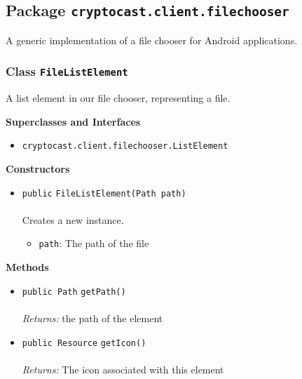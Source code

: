 \subsection{Package \lstinline!cryptocast.client.filechooser!}
A generic implementation of a file chooser for Android applications.

\subsubsection{Class \lstinline|FileListElement|}
A list element in our file chooser, representing a file. \\
\noindent\begin{minipage}[t]{5cm}
\vspace{0.3em}
\hspace*{2em}
\vspace{0.3em}
\end{minipage}



\textbf{\sffamily Superclasses and Interfaces}
\begin{itemize}
\item \lstinline|cryptocast.client.filechooser.ListElement|
\end{itemize}


\textbf{\sffamily Constructors}
\begin{itemize}
\item \lstinline|public| \lstinline|FileListElement|\lstinline|(Path path)|\\ \\[-0.6em]
Creates a new instance.
\begin{itemize}
\item \lstinline|path|: The path of the file
\end{itemize}



\end{itemize}


\textbf{\sffamily Methods}
\begin{itemize}
\item \lstinline|public Path| \lstinline|getPath|\lstinline|()|\\ \\[-0.6em]
\emph{Returns:} the path of the element



\item \lstinline|public Resource| \lstinline|getIcon|\lstinline|()|\\ \\[-0.6em]
\emph{Returns:} The icon associated with this element



\end{itemize}

